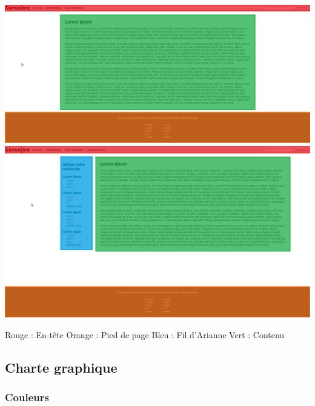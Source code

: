 \documentclass[letter, 10pt]{report}
\begin{document}
\includegraphics[scale=0.5]{primaryWindow.png}
\includegraphics[scale=0.5]{secondaryWindow.png}

Rouge : En-tête
Orange : Pied de page
Bleu : Fil d'Arianne
Vert : Contenu

\subsection{Charte graphique}

\subsubsection{Couleurs}
\end{document}
